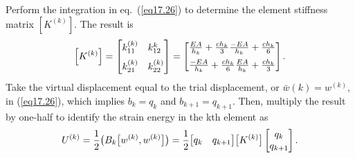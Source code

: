 \documentclass{AeroStructure-ERJohnson}
\begin{document}
Perform the integration in eq.~(\ref{eq17.26}) to determine the element stiffness matrix $\left[K^{(k)}\right]$. The result is
\begin{align}\label{eq17.27}
\left[K^{(k)}\right]=\left[\begin{array}{@{}ll@{}}k_{11}^{(k)} & k_{12}^{k} \\[6pt]
k_{21}^{(k)} & k_{22}^{(k)}\end{array}\right]=\left[\begin{array}{@{}l@{}}\frac{E A}{h_{k}}+\frac{c h_{k}}{3} \frac{-E A}{h_{k}}+\frac{c h_{k}}{6} \\[6pt]
\frac{-E A}{h_{k}}+\frac{c h_{k}}{6} \frac{E A}{h_{k}}+\frac{c h_{k}}{3}\end{array}\right].
\end{align}
Take the virtual displacement equal to the trial displacement, or $\bar{w}(k)=w^{(k)}$, in (\ref{eq17.26}), which implies $b_{k}=q_{k}$ and $b_{k+1}=q_{k+1}$. Then, multiply the result by one-half to identify the strain energy in the kth element as
\begin{align}\label{eq17.28}
U^{(k)}=\frac{1}{2}\big(B_{k}\big[w^{(k)}, w^{(k)}\big]\big)=\frac{1}{2}\big[\begin{array}{@{}ll@{}}q_{k} & q_{k+1}\end{array}\big]\big[K^{(k)}\big]\left[\begin{array}{@{}c@{}}q_{k} \\q_{k+1}\end{array}\right].
\end{align}

\vspace*{-1pc}
\end{document}
